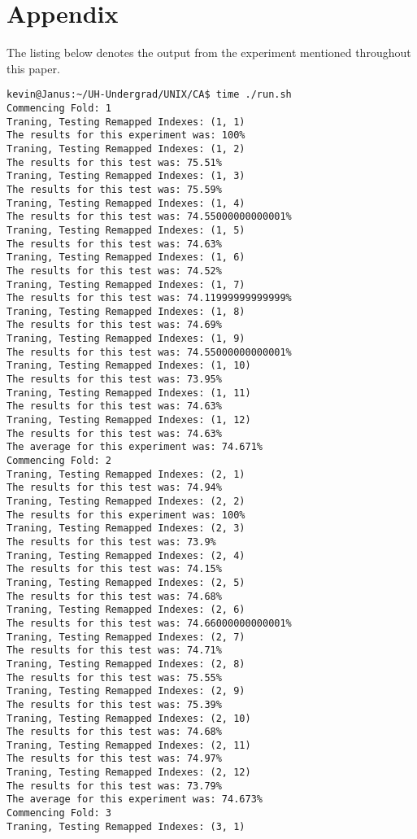 \newpage
\section{Appendix}
\label{sec:appendix}

The listing below denotes the output from the experiment mentioned throughout this paper. 
\begin{lstlisting}[basicstyle=\tiny]
kevin@Janus:~/UH-Undergrad/UNIX/CA$ time ./run.sh
Commencing Fold: 1
Traning, Testing Remapped Indexes: (1, 1)
The results for this experiment was: 100%
Traning, Testing Remapped Indexes: (1, 2)
The results for this test was: 75.51%
Traning, Testing Remapped Indexes: (1, 3)
The results for this test was: 75.59%
Traning, Testing Remapped Indexes: (1, 4)
The results for this test was: 74.55000000000001%
Traning, Testing Remapped Indexes: (1, 5)
The results for this test was: 74.63%
Traning, Testing Remapped Indexes: (1, 6)
The results for this test was: 74.52%
Traning, Testing Remapped Indexes: (1, 7)
The results for this test was: 74.11999999999999%
Traning, Testing Remapped Indexes: (1, 8)
The results for this test was: 74.69%
Traning, Testing Remapped Indexes: (1, 9)
The results for this test was: 74.55000000000001%
Traning, Testing Remapped Indexes: (1, 10)
The results for this test was: 73.95%
Traning, Testing Remapped Indexes: (1, 11)
The results for this test was: 74.63%
Traning, Testing Remapped Indexes: (1, 12)
The results for this test was: 74.63%
The average for this experiment was: 74.671%
Commencing Fold: 2
Traning, Testing Remapped Indexes: (2, 1)
The results for this test was: 74.94%
Traning, Testing Remapped Indexes: (2, 2)
The results for this experiment was: 100%
Traning, Testing Remapped Indexes: (2, 3)
The results for this test was: 73.9%
Traning, Testing Remapped Indexes: (2, 4)
The results for this test was: 74.15%
Traning, Testing Remapped Indexes: (2, 5)
The results for this test was: 74.68%
Traning, Testing Remapped Indexes: (2, 6)
The results for this test was: 74.66000000000001%
Traning, Testing Remapped Indexes: (2, 7)
The results for this test was: 74.71%
Traning, Testing Remapped Indexes: (2, 8)
The results for this test was: 75.55%
Traning, Testing Remapped Indexes: (2, 9)
The results for this test was: 75.39%
Traning, Testing Remapped Indexes: (2, 10)
The results for this test was: 74.68%
Traning, Testing Remapped Indexes: (2, 11)
The results for this test was: 74.97%
Traning, Testing Remapped Indexes: (2, 12)
The results for this test was: 73.79%
The average for this experiment was: 74.673%
Commencing Fold: 3
Traning, Testing Remapped Indexes: (3, 1)

\end{lstlisting}
